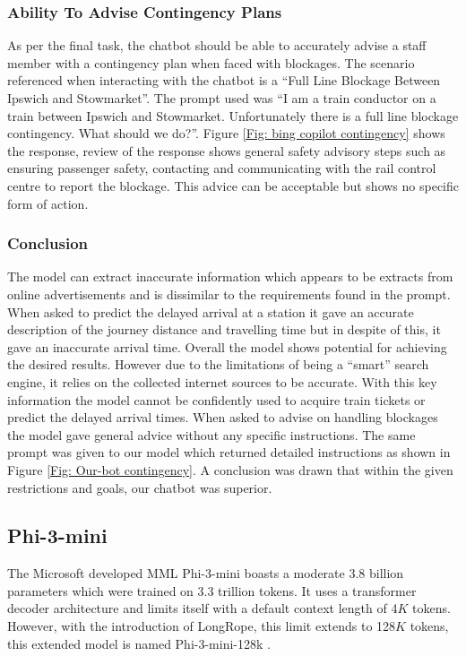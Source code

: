 \subsubsection{Ability To Advise Contingency Plans}\label{Sec: co-pilot contingencies}
As per the final task, the chatbot should be able to accurately advise a staff member with a contingency plan when faced with blockages. The scenario referenced when interacting with the chatbot is a ``Full Line Blockage Between Ipswich and Stowmarket''. The prompt used was ``I am a train conductor on a train between Ipswich and Stowmarket. Unfortunately there is a full line blockage contingency. What should we do?''. Figure \ref{Fig: bing copilot contingency} shows the response, review of the response shows general safety advisory steps such as ensuring passenger safety, contacting and communicating with the rail control centre to report the blockage. This advice can be acceptable but shows no specific form of action.

\subsubsection{Conclusion}
The model can extract inaccurate information which appears to be extracts from online advertisements and is dissimilar to the requirements found in the prompt. When asked to predict the delayed arrival at a station it gave an accurate description of the journey distance and travelling time but in despite of this, it gave an inaccurate arrival time. Overall the model shows potential for achieving the desired results. However due to the limitations of being a ``smart'' search engine, it relies on the collected internet sources to be accurate. %
With this key information the model cannot be confidently used to acquire train tickets or predict the delayed arrival times. When asked to advise on handling blockages the model gave general advice without any specific instructions. The same prompt was given to our model which returned detailed instructions as shown in Figure \ref{Fig: Our-bot contingency}. A conclusion was drawn that within the given restrictions and goals, our chatbot was superior.


\subsection{Phi-3-mini}
The Microsoft developed MML Phi-3-mini boasts a moderate 3.8 billion parameters which were trained on 3.3 trillion tokens. It uses a transformer decoder architecture and limits itself with a default context length of 4$K$ tokens. However, with the introduction of LongRope, this limit extends to 128$K$ tokens, this extended model is named Phi-3-mini-128k \citep{abdin2024phi}. %
